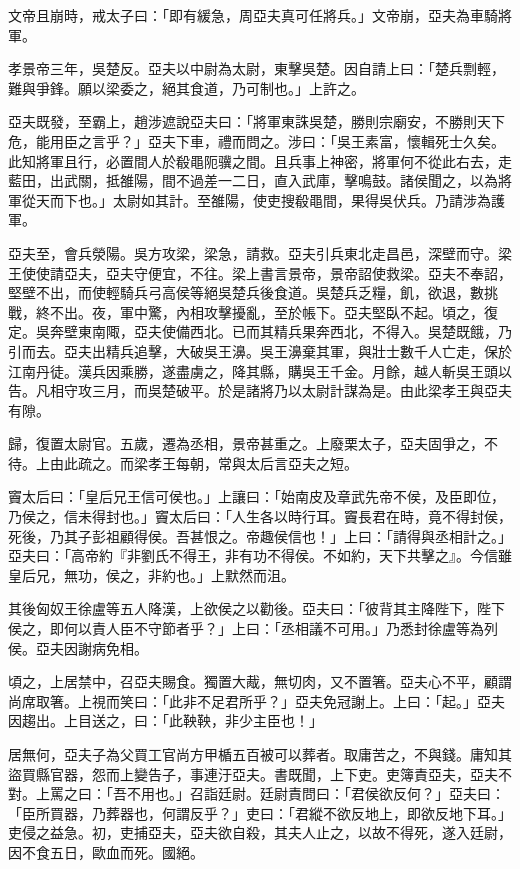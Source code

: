 \begin{pinyinscope}
文帝且崩時，戒太子曰：「即有緩急，周亞夫真可任將兵。」文帝崩，亞夫為車騎將軍。

孝景帝三年，吳楚反。亞夫以中尉為太尉，東擊吳楚。因自請上曰：「楚兵剽輕，難與爭鋒。願以梁委之，絕其食道，乃可制也。」上許之。

亞夫既發，至霸上，趙涉遮說亞夫曰：「將軍東誅吳楚，勝則宗廟安，不勝則天下危，能用臣之言乎？」亞夫下車，禮而問之。涉曰：「吳王素富，懷輯死士久矣。此知將軍且行，必置間人於殽黽阨骥之間。且兵事上神密，將軍何不從此右去，走藍田，出武關，抵雒陽，間不過差一二日，直入武庫，擊鳴鼓。諸侯聞之，以為將軍從天而下也。」太尉如其計。至雒陽，使吏搜殽黽間，果得吳伏兵。乃請涉為護軍。

亞夫至，會兵滎陽。吳方攻梁，梁急，請救。亞夫引兵東北走昌邑，深壁而守。梁王使使請亞夫，亞夫守便宜，不往。梁上書言景帝，景帝詔使救梁。亞夫不奉詔，堅壁不出，而使輕騎兵弓高侯等絕吳楚兵後食道。吳楚兵乏糧，飢，欲退，數挑戰，終不出。夜，軍中驚，內相攻擊擾亂，至於帳下。亞夫堅臥不起。頃之，復定。吳奔壁東南陬，亞夫使備西北。已而其精兵果奔西北，不得入。吳楚既餓，乃引而去。亞夫出精兵追擊，大破吳王濞。吳王濞棄其軍，與壯士數千人亡走，保於江南丹徒。漢兵因乘勝，遂盡虜之，降其縣，購吳王千金。月餘，越人斬吳王頭以告。凡相守攻三月，而吳楚破平。於是諸將乃以太尉計謀為是。由此梁孝王與亞夫有隙。

歸，復置太尉官。五歲，遷為丞相，景帝甚重之。上廢栗太子，亞夫固爭之，不待。上由此疏之。而梁孝王每朝，常與太后言亞夫之短。

竇太后曰：「皇后兄王信可侯也。」上讓曰：「始南皮及章武先帝不侯，及臣即位，乃侯之，信未得封也。」竇太后曰：「人生各以時行耳。竇長君在時，竟不得封侯，死後，乃其子彭祖顧得侯。吾甚恨之。帝趣侯信也！」上曰：「請得與丞相計之。」亞夫曰：「高帝約『非劉氏不得王，非有功不得侯。不如約，天下共擊之』。今信雖皇后兄，無功，侯之，非約也。」上默然而沮。

其後匈奴王徐盧等五人降漢，上欲侯之以勸後。亞夫曰：「彼背其主降陛下，陛下侯之，即何以責人臣不守節者乎？」上曰：「丞相議不可用。」乃悉封徐盧等為列侯。亞夫因謝病免相。

頃之，上居禁中，召亞夫賜食。獨置大胾，無切肉，又不置箸。亞夫心不平，顧謂尚席取箸。上視而笑曰：「此非不足君所乎？」亞夫免冠謝上。上曰：「起。」亞夫因趨出。上目送之，曰：「此鞅鞅，非少主臣也！」

居無何，亞夫子為父買工官尚方甲楯五百被可以葬者。取庸苦之，不與錢。庸知其盜買縣官器，怨而上變告子，事連汙亞夫。書既聞，上下吏。吏簿責亞夫，亞夫不對。上罵之曰：「吾不用也。」召詣廷尉。廷尉責問曰：「君侯欲反何？」亞夫曰：「臣所買器，乃葬器也，何謂反乎？」吏曰：「君縱不欲反地上，即欲反地下耳。」吏侵之益急。初，吏捕亞夫，亞夫欲自殺，其夫人止之，以故不得死，遂入廷尉，因不食五日，歐血而死。國絕。


\end{pinyinscope}

